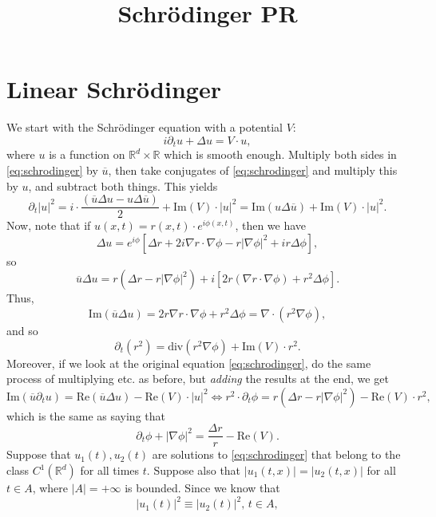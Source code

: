 \documentclass[a4paper,11pt,reqno]{amsart}
\title{Schr\"odinger PR}
\numberwithin{equation}{section}
\theoremstyle{plain} %
\theoremstyle{definition} %
\theoremstyle{remark}
\newcommand{\R}{\mathbb{R}}
\begin{document}
\maketitle 

\section{Linear Schr\"odinger}

We start with the Schr\"odinger equation with a potential $V$:
\begin{equation}\label{eq:schrodinger}
i \partial_t u + \Delta u = V \cdot u,
\end{equation}
where $u$ is a function on $\R^d \times \R$ which is smooth enough. Multiply both sides in \eqref{eq:schrodinger} by $\overline{u}$, then take conjugates of \eqref{eq:schrodinger} and multiply this by $u$, and subtract both things. This yields 
\[
\partial_t |u|^2 = i \cdot \frac{\left(\overline{u} \Delta u - u \Delta \overline{u}\right)}{2}+ \text{Im}(V) \cdot |u|^2 = \text{Im}(u \Delta \overline{u}) + \text{Im}(V)\cdot |u|^2.
\]
Now, note that if $u(x,t) = r(x,t) \cdot e^{i \phi(x,t)}$, then we have 
\[
\Delta u = e^{i\phi}[\Delta r + 2i\nabla r\cdot\nabla\phi - r|\nabla\phi|^2 + i r\Delta\phi],
\]
so
\[
\overline{u}\Delta u = r(\Delta r - r|\nabla\phi|^2) + i[2r(\nabla r\cdot\nabla\phi) + r^2\Delta\phi].
\]
Thus,
\[
\text{Im}(\overline{u}\Delta u) = 2r\nabla r\cdot\nabla\phi + r^2\Delta\phi = \nabla\cdot(r^2\nabla\phi),
\]
and so 
\begin{equation}\label{eq:first-eq}
\partial_t (r^2) = \text{div}(r^2 \nabla \phi) + \text{Im}(V) \cdot r^2. 
\end{equation}
Moreover, if we look at the original equation \eqref{eq:schrodinger}, do the same process of multiplying etc. as before, but \emph{adding} the results at the end, we get 
\[
\text{Im}(\overline{u} \partial_t u) = \text{Re}(\overline{u} \Delta u) - \text{Re}(V) \cdot |u|^2\iff r^2 \cdot \partial_t \phi = r (\Delta r - r |\nabla \phi|^2) - \text{Re}(V) \cdot r^2, 
\]
which is the same as saying that 
\begin{equation}\label{eq:second-eq}
    \partial_t \phi + |\nabla \phi|^2= \frac{\Delta r}{r} - \text{Re}(V).
\end{equation}
Suppose that $u_1(t),u_2(t)$ are solutions to \eqref{eq:schrodinger} that belong to the class $ C^1(\R^d)$ for all times $t.$ Suppose also that $|u_1(t,x)| = |u_2(t,x)|$ for all $t \in A$, where $|A| = +\infty$ is bounded. Since we know that 
\[
|u_1(t)|^2 \equiv |u_2(t)|^2, \, t \in A,
\]
\end{document}
